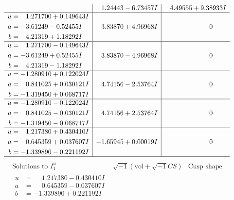 \documentclass[1p]{elsarticle_modified}
\theoremstyle{definition}
\newcommand{\I}{\sqrt{-1}}
\begin{document}
$$\begin{array}{c|c|c}
 & \phantom{-}1.24443 - 6.73457 I & \phantom{-}4.49555 + 9.38933 I \\ \hline\begin{aligned}
u &= \phantom{-}1.271700 + 0.149643 I \\
a &= -3.61249 - 0.52455 I \\
b &= \phantom{-}4.21319 + 1.18292 I\end{aligned}
 & \phantom{-}3.83870 + 4.96968 I & \phantom{-0.000000 } 0 \\ \hline\begin{aligned}
u &= \phantom{-}1.271700 - 0.149643 I \\
a &= -3.61249 + 0.52455 I \\
b &= \phantom{-}4.21319 - 1.18292 I\end{aligned}
 & \phantom{-}3.83870 - 4.96968 I & \phantom{-0.000000 } 0 \\ \hline\begin{aligned}
u &= -1.280910 + 0.122024 I \\
a &= \phantom{-}0.841025 + 0.030121 I \\
b &= -1.319450 + 0.068717 I\end{aligned}
 & \phantom{-}4.74156 - 2.53764 I & \phantom{-0.000000 } 0 \\ \hline\begin{aligned}
u &= -1.280910 - 0.122024 I \\
a &= \phantom{-}0.841025 - 0.030121 I \\
b &= -1.319450 - 0.068717 I\end{aligned}
 & \phantom{-}4.74156 + 2.53764 I & \phantom{-0.000000 } 0 \\ \hline\begin{aligned}
u &= \phantom{-}1.217380 + 0.430410 I \\
a &= \phantom{-}0.645359 + 0.037607 I \\
b &= -1.339890 - 0.221192 I\end{aligned}
 & -1.65945 + 0.00019 I & \phantom{-0.000000 } 0\\
 \hline 
 \end{array}$$\newpage$$\begin{array}{c|c|c}  
\text{Solutions to }I^u_{1}& \I (\text{vol} + \sqrt{-1}CS) & \text{Cusp shape}\\
 \hline 
\begin{aligned}
u &= \phantom{-}1.217380 - 0.430410 I \\
a &= \phantom{-}0.645359 - 0.037607 I \\
b &= -1.339890 + 0.221192 I\end{aligned}

\end{array}$$
\end{document}
